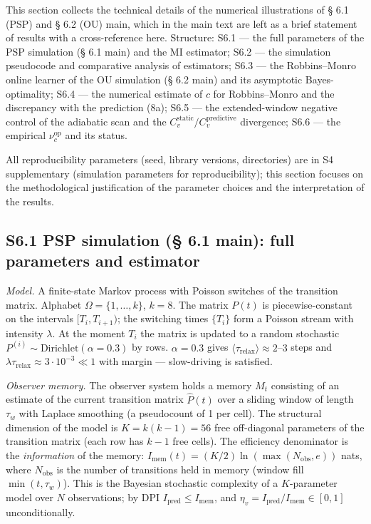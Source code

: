 \documentclass[pdflatex,sn-mathphys-ay]{sn-jnl}
\begin{document}
This section collects the technical details of the numerical illustrations of § 6.1 (PSP) and § 6.2 (OU) main, which in the main text are left as a brief statement of results with a cross-reference here. Structure: S6.1 --- the full parameters of the PSP simulation (§ 6.1 main) and the MI estimator; S6.2 --- the simulation pseudocode and comparative analysis of estimators; S6.3 --- the Robbins--Monro online learner of the OU simulation (§ 6.2 main) and its asymptotic Bayes-optimality; S6.4 --- the numerical estimate of \(c\) for Robbins--Monro and the discrepancy with the prediction (8a); S6.5 --- the extended-window negative control of the adiabatic scan and the \(C_v^{\text{static}}/C_v^{\text{predictive}}\) divergence; S6.6 --- the empirical \(\nu_c^{\text{op}}\) and its status.



All reproducibility parameters (seed, library versions, directories) are in S4 supplementary (simulation parameters for reproducibility); this section focuses on the methodological justification of the parameter choices and the interpretation of the results.



\subsection*{S6.1 PSP simulation (§ 6.1 main): full parameters and estimator}\label{s6.1-psp-simulation-6.1-main-full-parameters-and-estimator}



\emph{Model.} A finite-state Markov process with Poisson switches of the transition matrix. Alphabet \(\Omega = \{1, \ldots, k\}\), \(k = 8\). The matrix \(P(t)\) is piecewise-constant on the intervals \([T_i, T_{i+1})\); the switching times \(\{T_i\}\) form a Poisson stream with intensity \(\lambda\). At the moment \(T_i\) the matrix is updated to a random stochastic \(P^{(i)} \sim \text{Dirichlet}(\alpha = 0.3)\) by rows. \(\alpha = 0.3\) gives \(\langle \tau_{\text{relax}} \rangle \approx 2\)--\(3\) steps and \(\lambda \tau_{\text{relax}} \approx 3 \cdot 10^{-3} \ll 1\) with margin --- slow-driving is satisfied.



\emph{Observer memory.} The observer system holds a memory \(M_t\) consisting of an estimate of the current transition matrix \(\hat{P}(t)\) over a sliding window of length \(\tau_w\) with Laplace smoothing (a pseudocount of 1 per cell). The structural dimension of the model is \(K = k(k-1) = 56\) free off-diagonal parameters of the transition matrix (each row has \(k-1\) free cells). The efficiency denominator is the \emph{information} of the memory: \(I_{\text{mem}}(t) = (K/2)\ln(\max(N_{\text{obs}}, e))\) nats, where \(N_{\text{obs}}\) is the number of transitions held in memory (window fill \(\min(t, \tau_w)\)). This is the Bayesian stochastic complexity of a \(K\)-parameter model over \(N\) observations; by DPI \(I_{\text{pred}} \le I_{\text{mem}}\), and \(\eta_v = I_{\text{pred}}/I_{\text{mem}} \in [0,1]\) unconditionally.
\end{document}
